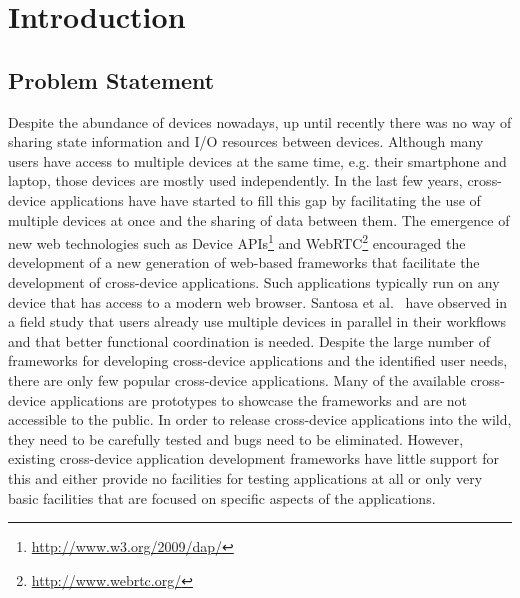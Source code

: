 \chapter{Introduction}

\section{Problem Statement}

Despite the abundance of devices nowadays, up until recently there was no way of sharing state information and I/O resources between devices. Although many users have access to multiple devices at the same time, e.g. their smartphone and laptop, those devices are mostly used independently. In the last few years, cross-device applications have have started to fill this gap by facilitating the use of multiple devices at once and the sharing of data between them. The emergence of new web technologies such as Device APIs\footnote{\url{http://www.w3.org/2009/dap/}} and WebRTC\footnote{\url{http://www.webrtc.org/}} encouraged the development of a new generation of web-based frameworks that facilitate the development of cross-device applications. Such applications typically run on any device that has access to a modern web browser. Santosa et al.~\cite{santosa2013} have observed in a field study that users already use multiple devices in parallel in their workflows and that better functional coordination is needed. Despite the large number of frameworks for developing cross-device applications and the identified user needs, there are only few popular cross-device applications. Many of the available cross-device applications are prototypes to showcase the frameworks and are not accessible to the public. In order to release cross-device applications into the wild, they need to be carefully tested and bugs need to be eliminated. However, existing cross-device application development frameworks have little support for this and either provide no facilities for testing applications at all or only very basic facilities that are focused on specific aspects of the applications.  

